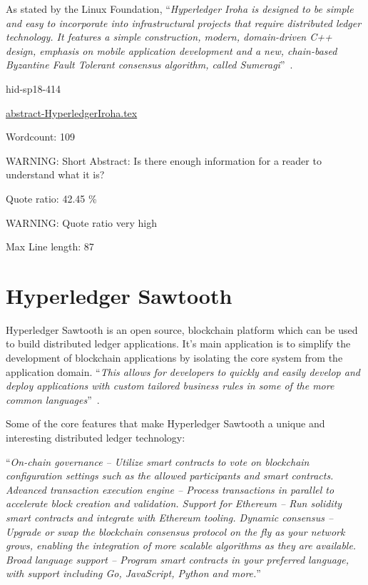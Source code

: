 As stated by the Linux Foundation, \color{blue}``\emph{Hyperledger Iroha is designed to
be simple and easy to incorporate into infrastructural projects that
require distributed ledger technology. It features a simple
construction, modern, domain-driven C++ design, emphasis on mobile
application development and a new, chain-based Byzantine Fault
Tolerant consensus algorithm, called 
Sumeragi}''\color{black}~\cite{hid-sp18-414-Active_Status_Iroha}.



\begin{IU}

hid-sp18-414

\href{https://github.com/cloudmesh-community/hid-sp18-414/blob/master//technology/abstract-HyperledgerIroha.tex}{abstract-HyperledgerIroha.tex}

 

Wordcount: 109

WARNING: Short Abstract: Is there enough information for a reader to understand what it is?


Quote ratio: 42.45 \%

WARNING: Quote ratio very high
 
Max Line length: 87
\end{IU}

\section{Hyperledger Sawtooth}

Hyperledger Sawtooth is an open source, blockchain platform which can
be used to build distributed ledger applications. It’s main
application is to simplify the development of blockchain applications
by isolating the core system from the application domain. \color{blue}``\emph{This
allows for developers to quickly and easily develop and deploy
applications with custom tailored business rules in some of the more
common languages}''\color{black}~\cite{hid-sp18-414-Hyperledger_Sawtooth}.

Some of the core features that make Hyperledger Sawtooth a unique and
interesting distributed ledger technology:
  
\color{blue}``\emph{On-chain governance – Utilize smart contracts to vote on blockchain
configuration settings such as the allowed participants and smart
contracts.  Advanced transaction execution engine – Process
transactions in parallel to accelerate block creation and validation.
Support for Ethereum – Run solidity smart contracts and integrate with
Ethereum tooling.  Dynamic consensus – Upgrade or swap the blockchain
consensus protocol on the fly as your network grows, enabling the
integration of more scalable algorithms as they are available.  Broad
language support – Program smart contracts in your preferred language,
with support including Go, JavaScript, Python and 
more.}''\color{black}~\cite{hid-sp18-414-Linux_Foundation_Sawtooth}



